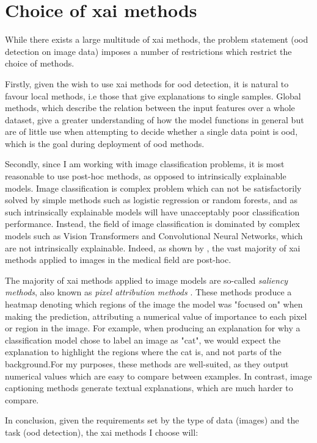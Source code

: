 \documentclass[UKenglish]{uiomasterthesis} %
\theoremstyle{definition}
\begin{document}
\section{Choice of \ac{xai} methods}

While there exists a large multitude of \ac{xai} methods, the problem statement (\ac{ood} detection on image data) imposes a number of restrictions which restrict the choice of methods.

Firstly, given the wish to use \ac{xai} methods for \ac{ood} detection, it is natural to favour local methods, i.e those that give explanations to single samples. Global methods, which describe the relation between the input features over a whole dataset, give a greater understanding of how the model functions in general but are of little use when attempting to decide whether a single data point is \ac{ood}, which is the goal during deployment of \ac{ood} methods.

Secondly, since I am working with image classification problems, it is most reasonable to use post-hoc methods, as opposed to intrinsically explainable models.  Image classification is complex problem which can not be satisfactorily solved by simple methods such as logistic regression or random forests, and as such intrinsically explainable models will have unacceptably poor classification performance. Instead, the field of image classification is dominated by complex models such as Vision Transformers and Convolutional Neural Networks, which are not intrinsically explainable. Indeed, as shown by \cite{xaioverview}, the vast majority of \ac{xai} methods applied to images in the medical field are post-hoc.

The majority of \ac{xai} methods applied to image models are so-called {\it saliency methods}, also known as {\it pixel attribution methods} \cite{molnar}. These methods produce a heatmap denoting which regions of the image the model was "focused on" when making the prediction, attributing a numerical value of importance to each pixel or region in the image. For example, when producing an explanation for why a classification model chose to label an image as "cat", we would expect the explanation to highlight the regions where the cat is, and not parts of the background.For my purposes, these methods are well-suited, as they output numerical values which are easy to compare between examples. In contrast, image captioning methods generate textual explanations, which are much harder to compare.

In conclusion, given the requirements set by the type of data (images) and the task (\ac{ood} detection), the \ac{xai} methods I choose will:
\end{document}
